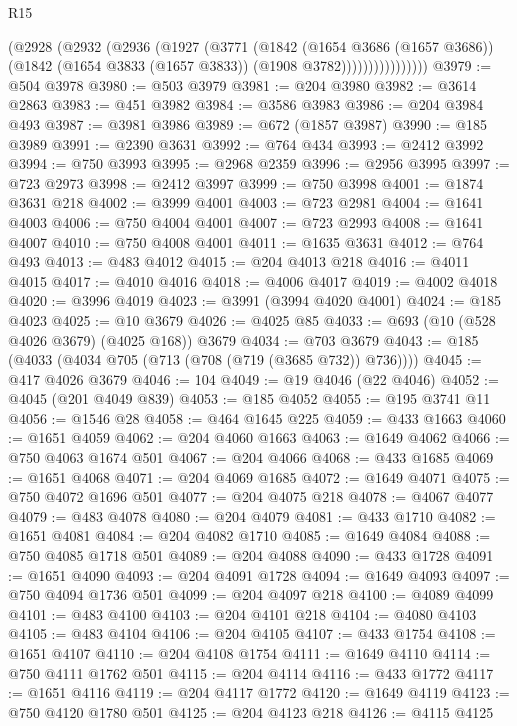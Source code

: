 \begin{lexlean}{R15}
\begin{coremodule}
{{{{{{{{{{{                    (@2928
                      (@2932
                        (@2936
                          (@1927
                            (@3771
                              (@1842
                                (@1654 @3686 (@1657 @3686))
                                (@1842 (@1654 @3833 (@1657 @3833)) (@1908 @3782))))))))))))))))
@3979 := @504 @3978
@3980 := @503 @3979
@3981 := @204 @3980
@3982 := @3614 @2863
@3983 := @451 @3982
@3984 := @3586 @3983
@3986 := @204 @3984 @493
@3987 := @3981 @3986
@3989 := @672 (@1857 @3987)
@3990 := @185 @3989
@3991 := @2390 @3631
@3992 := @764 @434
@3993 := @2412 @3992
@3994 := @750 @3993
@3995 := @2968 @2359
@3996 := @2956 @3995
@3997 := @723 @2973
@3998 := @2412 @3997
@3999 := @750 @3998
@4001 := @1874 @3631 @218
@4002 := @3999 @4001
@4003 := @723 @2981
@4004 := @1641 @4003
@4006 := @750 @4004 @4001
@4007 := @723 @2993
@4008 := @1641 @4007
@4010 := @750 @4008 @4001
@4011 := @1635 @3631
@4012 := @764 @493
@4013 := @483 @4012
@4015 := @204 @4013 @218
@4016 := @4011 @4015
@4017 := @4010 @4016
@4018 := @4006 @4017
@4019 := @4002 @4018
@4020 := @3996 @4019
@4023 := @3991 (@3994 @4020 @4001)
@4024 := @185 @4023
@4025 := @10 @3679
@4026 := @4025 @85
@4033 := @693 (@10 (@528 @4026 @3679) (@4025 @168)) @3679
@4034 := @703 @3679
@4043 := @185 (@4033 (@4034 @705 (@713 (@708 (@719 (@3685 @732)) @736))))
@4045 := @417 @4026 @3679
@4046 := 104
@4049 := @19 @4046 (@22 @4046)
@4052 := @4045 (@201 @4049 @839)
@4053 := @185 @4052
@4055 := @195 @3741 @11
@4056 := @1546 @28
@4058 := @464 @1645 @225
@4059 := @433 @1663
@4060 := @1651 @4059
@4062 := @204 @4060 @1663
@4063 := @1649 @4062
@4066 := @750 @4063 @1674 @501
@4067 := @204 @4066
@4068 := @433 @1685
@4069 := @1651 @4068
@4071 := @204 @4069 @1685
@4072 := @1649 @4071
@4075 := @750 @4072 @1696 @501
@4077 := @204 @4075 @218
@4078 := @4067 @4077
@4079 := @483 @4078
@4080 := @204 @4079
@4081 := @433 @1710
@4082 := @1651 @4081
@4084 := @204 @4082 @1710
@4085 := @1649 @4084
@4088 := @750 @4085 @1718 @501
@4089 := @204 @4088
@4090 := @433 @1728
@4091 := @1651 @4090
@4093 := @204 @4091 @1728
@4094 := @1649 @4093
@4097 := @750 @4094 @1736 @501
@4099 := @204 @4097 @218
@4100 := @4089 @4099
@4101 := @483 @4100
@4103 := @204 @4101 @218
@4104 := @4080 @4103
@4105 := @483 @4104
@4106 := @204 @4105
@4107 := @433 @1754
@4108 := @1651 @4107
@4110 := @204 @4108 @1754
@4111 := @1649 @4110
@4114 := @750 @4111 @1762 @501
@4115 := @204 @4114
@4116 := @433 @1772
@4117 := @1651 @4116
@4119 := @204 @4117 @1772
@4120 := @1649 @4119
@4123 := @750 @4120 @1780 @501
@4125 := @204 @4123 @218
@4126 := @4115 @4125
}}}}}}}}}}}
\end{coremodule}
\end{lexlean}
